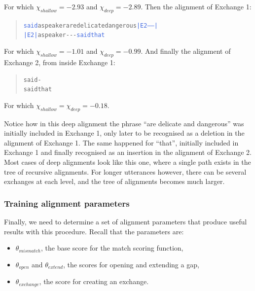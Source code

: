 For which \(\chi_{shallow} = -2.93\) and \(\chi_{deep} = -2.89\). Then
the alignment of Exchange 1:

\begin{quote}\begin{alltt}\small
\textcolor{RoyalBlue}{said} a speaker \textcolor{BrickRed}{are delicate dangerous} \textcolor{RoyalBlue}{|E2-----|}
\textcolor{RoyalBlue}{|E2|} a speaker -   -        -         \textcolor{RoyalBlue}{said that}
\end{alltt}\end{quote}

For which \(\chi_{shallow} = -1.01\) and \(\chi_{deep} = -0.99\). And
finally the alignment of Exchange 2, from inside Exchange 1:

\begin{quote}\begin{alltt}\small
said -    
said \textcolor{OliveGreen}{that}
\end{alltt}\end{quote}

For which \(\chi_{shallow} = \chi_{deep} = -0.18\).

Notice how in this deep alignment the phrase \enquote{are delicate and
dangerous} was initially included in Exchange 1, only later to be
recognised as a deletion in the alignment of Exchange 1. The same
happened for \enquote{that}, initially included in Exchange 1 and
finally recognised as an insertion in the alignment of Exchange 2. Most
cases of deep alignments look like this one, where a single path exists
in the tree of recursive alignments. For longer utterances however,
there can be several exchanges at each level, and the tree of alignments
becomes much larger.

\subsubsection{Training alignment
parameters}\label{training-alignment-parameters}

Finally, we need to determine a set of alignment parameters that produce
useful results with this procedure. Recall that the parameters are:

\begin{itemize}
\item
  \(\theta_{mismatch}\), the base score for the match scoring function,
\item
  \(\theta_{open}\) and \(\theta_{extend}\), the scores for opening and
  extending a gap,
\item
  \(\theta_{exchange}\), the score for creating an exchange.
\end{itemize}

